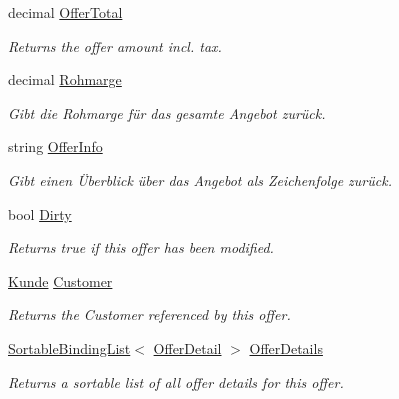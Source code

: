 \begin{DoxyCompactItemize}
decimal \hyperlink{class_products_1_1_model_1_1_entities_1_1_offer_a8f050d1a46bb57af13471a9185b98f51}{Offer\+Total}
\begin{DoxyCompactList}\small\item\em Returns the offer amount incl. tax. \end{DoxyCompactList}\item 
decimal \hyperlink{class_products_1_1_model_1_1_entities_1_1_offer_a25ba7044c71085b810db11fa8cfcb284}{Rohmarge}
\begin{DoxyCompactList}\small\item\em Gibt die Rohmarge für das gesamte Angebot zurück. \end{DoxyCompactList}\item 
string \hyperlink{class_products_1_1_model_1_1_entities_1_1_offer_a1434edf08f08dfd5d6502afa74527ff2}{Offer\+Info}
\begin{DoxyCompactList}\small\item\em Gibt einen Überblick über das Angebot als Zeichenfolge zurück. \end{DoxyCompactList}\item 
bool \hyperlink{class_products_1_1_model_1_1_entities_1_1_offer_ae3cc0fa3b3df9aa2dca2168b2e3ac088}{Dirty}
\begin{DoxyCompactList}\small\item\em Returns true if this offer has been modified. \end{DoxyCompactList}\item 
\hyperlink{class_products_1_1_model_1_1_entities_1_1_kunde}{Kunde} \hyperlink{class_products_1_1_model_1_1_entities_1_1_offer_ad12ba45d35da3a0e38b62798a885f66e}{Customer}
\begin{DoxyCompactList}\small\item\em Returns the Customer referenced by this offer. \end{DoxyCompactList}\item 
\hyperlink{class_products_1_1_common_1_1_sortable_binding_list}{Sortable\+Binding\+List}$<$ \hyperlink{class_products_1_1_model_1_1_entities_1_1_offer_detail}{Offer\+Detail} $>$ \hyperlink{class_products_1_1_model_1_1_entities_1_1_offer_a6175d39c3bf378ac41bc967b4b074dfc}{Offer\+Details}
\begin{DoxyCompactList}\small\item\em Returns a sortable list of all offer details for this offer. \end{DoxyCompactList}\end{DoxyCompactItemize}


